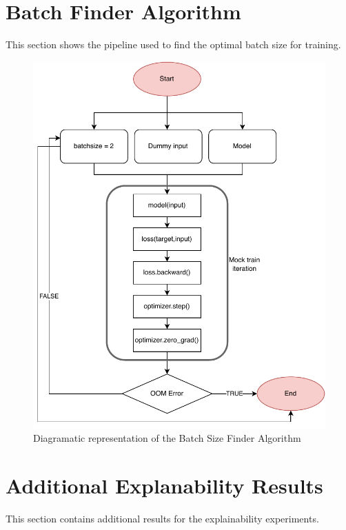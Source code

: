 \documentclass[a4paper,11pt,openright]{book}
\begin{document}
\section{Batch Finder Algorithm}
This section shows the pipeline used to find the optimal batch size for training. 
\begin{figure}[!htb]
    \centering
    \includegraphics[width=0.6\linewidth]{images/batchsizefinder.pdf}
    \caption{Diagramatic representation of the Batch Size Finder Algorithm}
    \label{fig:bsfinder}
\end{figure}

\section{Additional Explanability Results}
This section contains additional results for the explainability experiments. 
\end{document}
